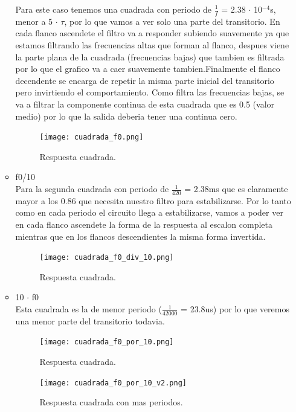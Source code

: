 \documentclass[11pt]{diazessay} %
\begin{document}
\begin{itemize}
\begin{itemize}
Para este caso tenemos una cuadrada con periodo de $\frac{1}{f}$ = 2.38 $\cdot$ 10$^{-4}$s, menor a 5 $\cdot$ $\tau$, por lo que vamos a ver solo una parte del transitorio. En cada flanco ascendete el filtro va a responder subiendo suavemente ya que estamos filtrando las frecuencias altas que forman al flanco, despues viene la parte plana de la cuadrada (frecuencias bajas) que tambien es filtrada por lo que el grafico va a caer suavemente tambien.Finalmente el flanco decendente se encarga de repetir la misma parte inicial del transitorio pero invirtiendo el comportamiento. Como filtra las frecuencias bajas, se va a filtrar la componente continua de esta cuadrada que es 0.5 (valor medio) por lo que  la salida deberia tener una continua cero.
	\begin{figure}[h]
		\centering
			\texttt{[image: cuadrada\_f0.png]}
	\caption{Respuesta cuadrada.}
	\end{figure}
\newpage
\item f0/10 \\
Para la segunda cuadrada con periodo de $\frac{1}{420}$ = 2.38ms que es claramente mayor a los 0.86 que necesita nuestro filtro para estabilizarse. Por lo tanto como en cada periodo el circuito llega a estabilizarse, vamos a poder ver en cada flanco ascendete la forma de la respuesta al escalon completa mientras que en los flancos descendientes la misma forma invertida.
	\begin{figure}[h]
		\centering
			\texttt{[image: cuadrada\_f0\_div\_10.png]}
	\caption{Respuesta cuadrada.}
	\end{figure}
\newpage
\item 10 $\cdot$ f0 \\
Esta cuadrada es la de menor periodo ($\frac{1}{42000}$ = 23.8us) por lo que veremos una menor parte del transitorio todavia.
	\begin{figure}[h]
		\centering
			\texttt{[image: cuadrada\_f0\_por\_10.png]}
	\caption{Respuesta cuadrada.}
	\end{figure}
	\begin{figure}[h]
		\centering
			\texttt{[image: cuadrada\_f0\_por\_10\_v2.png]}
	\caption{Respuesta cuadrada con mas periodos.}
	\end{figure}

\end{itemize}
\end{itemize}

\newpage
\end{document}
